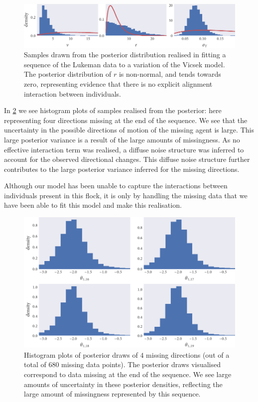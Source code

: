 \begin{figure}[tb]
  \includegraphics{params_hist.pdf}
  \caption{Samples drawn from the posterior distribution realised in fitting a
    sequence of the Lukeman data to a variation of the Vicsek model. The
    posterior distribution of $r$ is non-normal, and tends towards zero,
    representing evidence that there is no explicit alignment interaction
    between individuals.}
  \label{fig:lukeman_params}
\end{figure}

In \cref{fig:dir_hist} we see histogram plots of samples realised from the
posterior: here representing four directions missing at the end of the
sequence. We see that the uncertainty in the possible directions of motion of
the missing agent is large. This large posterior variance is a result of the
large amounts of missingness. As no effective interaction term was realised, a
diffuse noise structure was inferred to account for the observed directional
changes. This diffuse noise structure further contributes to the large
posterior variance inferred for the missing directions.

Although our model has been unable to capture the interactions between
individuals present in this flock, it is only by handling the missing data that
we have been able to fit this model and make this realisation.

\begin{figure}[tb]
  \includegraphics{dir_hist.pdf}
  \caption{Histogram plots of posterior draws of $4$ missing directions (out of
    a total of $680$ missing data points). The posterior draws visualised
    correspond to data missing at the end of the sequence. We see large amounts
    of uncertainty in these posterior densities, reflecting the large amount of
    missingness represented by this sequence.}
  \label{fig:dir_hist}
\end{figure}

